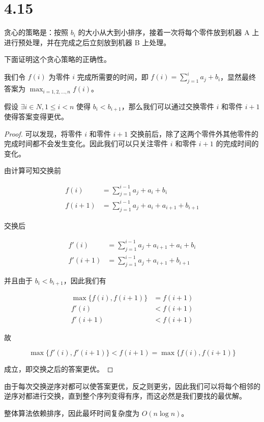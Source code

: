 \section*{4.15}

贪心的策略是：按照 $b_i$ 的大小从大到小排序，接着一次将每个零件放到机器 A 上进行预处理，并在完成之后立刻放到机器 B 上处理。

下面证明这个贪心策略的正确性。

我们令 $f(i)$ 为零件 $i$ 完成所需要的时间，即 $f(i) = \sum_{j=1}^{i}a_j + b_i$，显然最终答案为 $\max_{i=1,2,...,n}f(i)$。

假设 $\exists i \in N, 1 \le i < n$ 使得 $b_i < b_{i+1}$，那么我们可以通过交换零件 $i$ 和零件 $i+1$ 使得答案变得更优。

\begin{proof}
  可以发现，将零件 $i$ 和零件 $i+1$ 交换前后，除了这两个零件外其他零件的完成时间都不会发生变化。因此我们可以只关注零件 $i$ 和零件 $i+1$ 的完成时间的变化。

  由计算可知交换前

  $$
  \begin{aligned}
  f(i)   &= \sum_{j=1}^{i-1} a_j + a_{i} + b_{i} \\
  f(i+1) &= \sum_{j=1}^{i-1} a_j + a_{i} + a_{i+1} + b_{i+1}
  \end{aligned}
  $$

  交换后

  $$
  \begin{aligned}
  f'(i)   &= \sum_{j=1}^{i-1} a_j + a_{i+1} + a_{i} + b_{i} \\
  f'(i+1) &= \sum_{j=1}^{i-1} a_j + a_{i+1} + b_{i+1}
  \end{aligned}
  $$

  并且由于 $b_{i} < b_{i + 1}$，因此我们有

  $$
  \begin{aligned}
  \max\{f(i), f(i+1)\} &= f(i+1) \\
  f'(i) &< f(i+1) \\
  f'(i+1) &< f(i+1)
  \end{aligned}
  $$

  故

  $$
  \max\{f'(i), f'(i+1)\} < f(i+1) = \max\{f(i), f(i+1)\}
  $$

  成立，即交换之后的答案更优。
\end{proof}

由于每次交换逆序对都可以使答案更优，反之则更劣，因此我们可以将每个相邻的逆序对都进行交换，直到整个序列变得有序，而这必然是我们要找的最优解。

整体算法依赖排序，因此最坏时间复杂度为 $O(n \log n)$。
